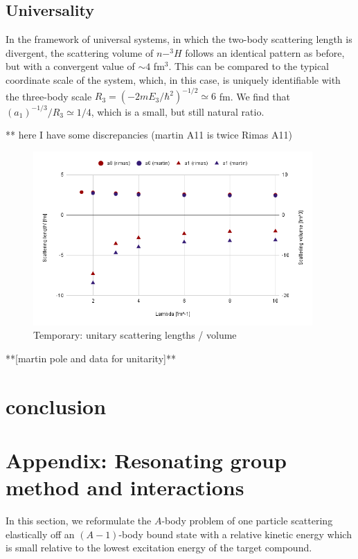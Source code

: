 \documentclass[aps,onecolumn,preprintnumbers,amsmath,amssymb,nofootinbib,superscriptaddress,notitlepage]{revtex4-1}
\begin{document}
\subsection*{Universality}

%
In the framework of universal systems, in which the two-body scattering length is divergent, the scattering volume of $n-^3H$ follows an identical pattern as before, but with a convergent value of $\sim4$ fm$^3$.
This can be compared to the typical coordinate scale of the system, which, in this case, is uniquely identifiable with the three-body scale $R_3=(-2mE_3/\hbar^2)^{-1/2}\simeq 6$ fm. 
We find that $(a_1)^{-1/3}/R_3 \simeq  1/4$, which is a small, but still natural ratio.

** here I have some discrepancies (martin A11 is twice Rimas A11)
\begin{figure}
\centering
\includegraphics[width=0.95\textwidth]{./Graphs/unitarityA} 
\caption{Temporary: unitary scattering lengths / volume}
\label{fig:Resonance_pole}
\end{figure}
**[martin pole and data for unitarity]**






\section{conclusion}







\section{Appendix: Resonating group method and interactions}
In this section, we reformulate the $A$-body problem of one particle scattering elastically off
an $(A-1)$-body bound state with a relative kinetic energy which is small relative to the lowest
excitation energy of the target compound.
\end{document}
